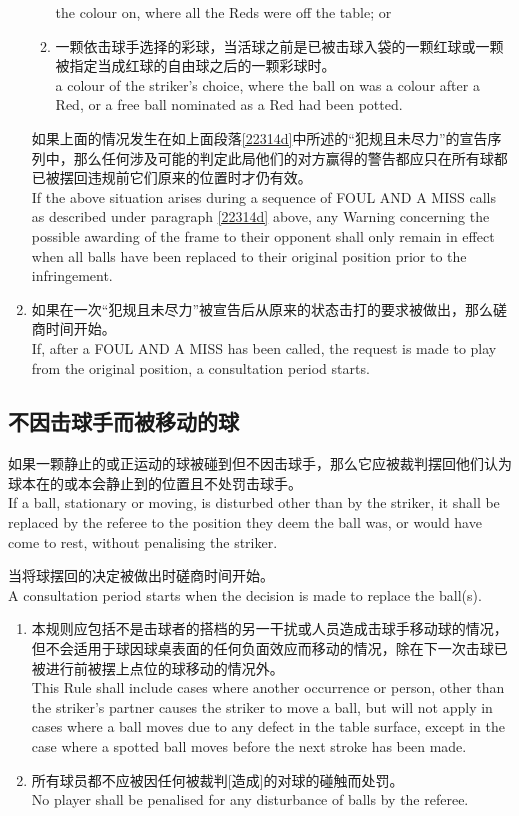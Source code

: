 \begin{enumerate}[label=(\alph*)]
\begin{enumerate}[label=(\roman*)]
        the colour on, where all the Reds were off the table; or
        \item 一颗依击球手选择的彩球，当活球之前是已被击球入袋的一颗红球或一颗被指定当成红球的自由球之后的一颗彩球时。\\
        a colour of the striker's choice, where the ball on was a colour after a Red, or a free ball nominated as a Red had been potted.
    \end{enumerate}
    如果上面的情况发生在如上面段落\ref{22314d}中所述的``犯规且未尽力''的宣告序列中，那么任何涉及可能的判定此局他们的对方赢得的警告都应只在所有球都已被摆回违规前它们原来的位置时才仍有效。\\
    If the above situation arises during a sequence of FOUL AND A MISS calls as described under paragraph \ref{22314d} above, any Warning concerning the possible awarding of the frame to their opponent shall only remain in effect when all balls have been replaced to their original position prior to the infringement.
    \item 如果在一次``犯规且未尽力''被宣告后从原来的状态击打的要求被做出，那么磋商时间开始。\\
    If, after a FOUL AND A MISS has been called, the request is made to play from the original position, a consultation period starts.
\end{enumerate}

\subsection{不因击球手而被移动的球}\label{22315}

\noindent 如果一颗静止的或正运动的球被碰到但不因击球手，那么它应被裁判摆回他们认为球本在的或本会静止到的位置且不处罚击球手。\\
If a ball, stationary or moving, is disturbed other than by the striker, it shall be replaced by the referee to the position they deem the ball was, or would have come to rest, without penalising the striker.

\noindent 当将球摆回的决定被做出时磋商时间开始。\\
A consultation period starts when the decision is made to replace the ball(s).
\begin{enumerate}[label=(\alph*)]
    \item 本规则应包括不是击球者的搭档的另一干扰或人员造成击球手移动球的情况，但不会适用于球因球桌表面的任何负面效应而移动的情况，除在下一次击球已被进行前被摆上点位的球移动的情况外。\\
    This Rule shall include cases where another occurrence or person, other than the striker's partner causes the striker to move a ball, but will not apply in cases where a ball moves due to any defect in the table surface, except in the case where a spotted ball moves before the next stroke has been made.
    \item 所有球员都不应被因任何被裁判[造成]的对球的碰触而处罚。\\
    No player shall be penalised for any disturbance of balls by the referee.
\end{enumerate}

